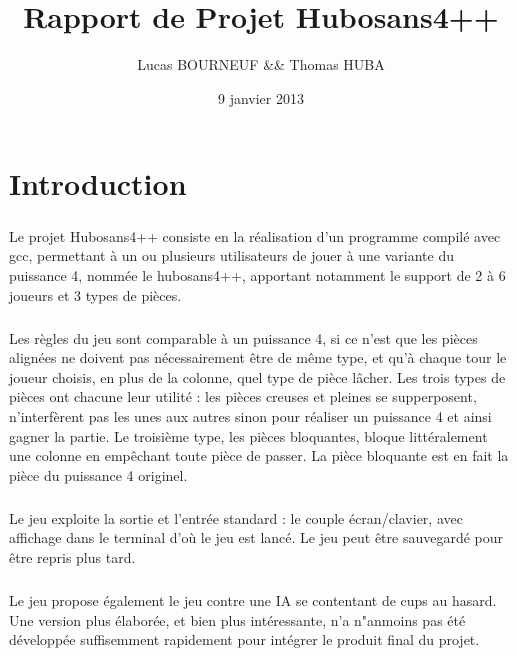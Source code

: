 \documentclass{report}
\title{Rapport de Projet Hubosans4++}
\author{Lucas BOURNEUF \&\& Thomas HUBA}
\date{9 janvier 2013}
\begin{document}
\maketitle


\chapter*{Introduction}
    \paragraph*{}
        Le projet Hubosans4++ consiste en la réalisation d'un programme compilé avec gcc, permettant à un ou plusieurs utilisateurs de jouer à une variante du puissance 4, nommée le hubosans4++,
        apportant notamment le support de 2 à 6 joueurs et 3 types de pièces. 
    \paragraph*{}
        Les règles du jeu sont comparable à un puissance 4, si ce n'est que les pièces alignées ne doivent pas nécessairement être de même type, et qu'à chaque tour le joueur choisis, 
        en plus de la colonne, quel type de pièce lâcher. Les trois types de pièces ont chacune leur utilité : les pièces creuses et pleines se supperposent, 
        n'interfèrent pas les unes aux autres sinon pour réaliser un puissance 4 et ainsi gagner la partie. 
        Le troisième type, les pièces bloquantes, bloque littéralement une colonne en empêchant toute pièce de passer. La pièce bloquante est en fait la pièce du puissance 4 originel.
    \paragraph*{}
        Le jeu exploite la sortie et l'entrée standard : le couple écran/clavier, avec affichage dans le terminal d'où le jeu est lancé.
        Le jeu peut être sauvegardé pour être repris plus tard.
    \paragraph*{}
        Le jeu propose également le jeu contre une IA se contentant de cups au hasard. Une version plus élaborée, et bien plus intéressante, n'a n"anmoins pas été développée
            suffisemment rapidement pour intégrer le produit final du projet.
\end{document}
